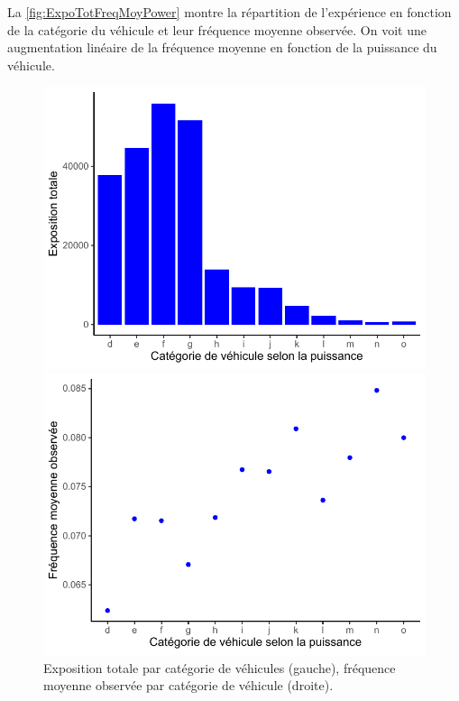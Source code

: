 La \autoref{fig:ExpoTotFreqMoyPower} montre la répartition de l'expérience en fonction de la catégorie du véhicule et leur fréquence moyenne observée. On voit une augmentation linéaire de la fréquence moyenne en fonction de la puissance du véhicule.

\begin{figure}
\caption{\label{fig:ExpoTotFreqMoyPower} Exposition totale par catégorie de véhicules (gauche), fréquence moyenne observée par catégorie de véhicule (droite).}
\begin{minipage}{0.4\linewidth}
\includegraphics[scale=0.5]{Graphiques/ExpoTotPower}
\end{minipage}
\hfill
\begin{minipage}{0.4\linewidth}
\includegraphics[scale=0.5]{Graphiques/FreqMoyPower}
\end{minipage}
\end{figure}

